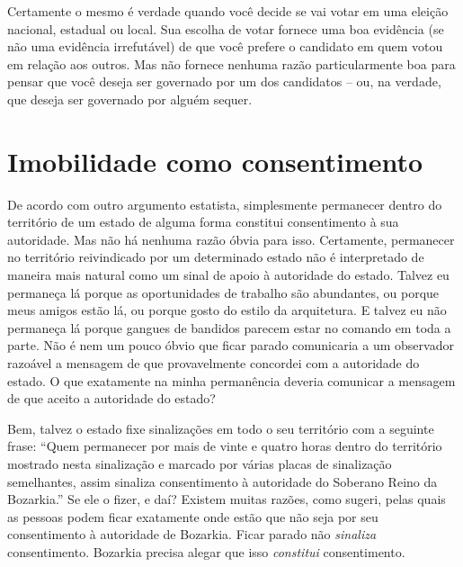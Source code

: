 Certamente o mesmo é verdade quando você decide se vai votar em uma eleição nacional, estadual ou local. Sua escolha de votar fornece uma boa evidência (se não uma evidência irrefutável) de que você prefere o candidato em quem votou em relação aos outros. Mas não fornece nenhuma razão particularmente boa para pensar que você deseja ser governado por um dos candidatos -- ou, na verdade, que deseja ser governado por alguém sequer.

\section{Imobilidade como consentimento}

De acordo com outro argumento estatista, simplesmente permanecer dentro do território de um estado de alguma forma constitui consentimento à sua autoridade. Mas não há nenhuma razão óbvia para isso. Certamente, permanecer no território reivindicado por um determinado estado não é interpretado de maneira mais natural como um sinal de apoio à autoridade do estado. Talvez eu permaneça lá porque as oportunidades de trabalho são abundantes, ou porque meus amigos estão lá, ou porque gosto do estilo da arquitetura. E talvez eu não permaneça lá porque gangues de bandidos parecem estar no comando em toda a parte. Não é nem um pouco óbvio que ficar parado comunicaria a um observador razoável a mensagem de que provavelmente concordei com a autoridade do estado. O que exatamente na minha permanência deveria comunicar a mensagem de que aceito a autoridade do estado?

Bem, talvez o estado fixe sinalizações em todo o seu território com a seguinte frase: ``Quem permanecer por mais de vinte e quatro horas dentro do território mostrado nesta sinalização e marcado por várias placas de sinalização semelhantes, assim sinaliza consentimento à autoridade do Soberano Reino da Bozarkia.'' Se ele o fizer, e daí? Existem muitas razões, como sugeri, pelas quais as pessoas podem ficar exatamente onde estão que não seja por seu consentimento à autoridade de Bozarkia. Ficar parado não \emph{sinaliza} consentimento. Bozarkia precisa alegar que isso \emph{constitui} consentimento.

